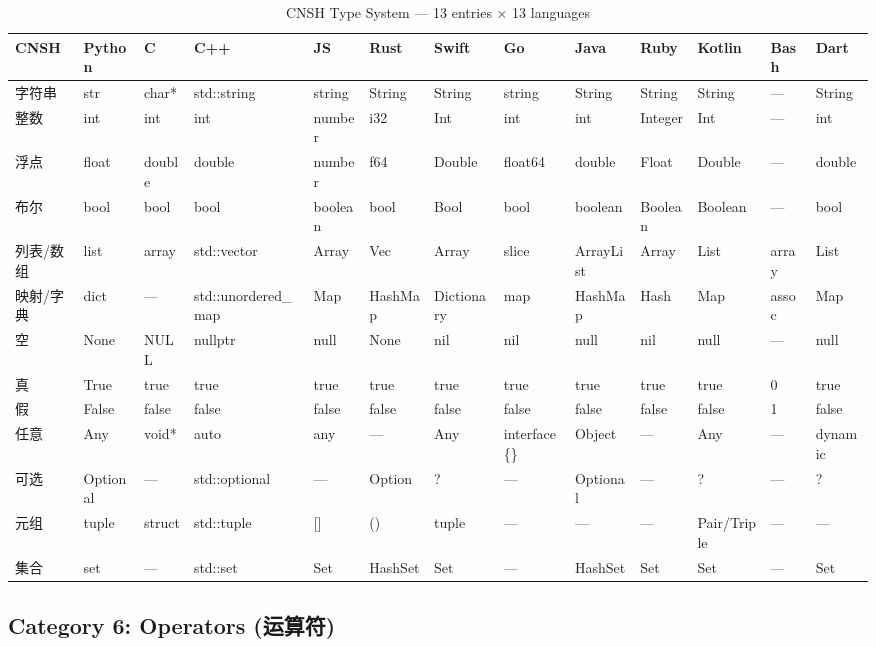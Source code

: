 \begin{table}[h]
\centering
\caption{CNSH Type System — 13 entries × 13 languages}
\renewcommand{\arraystretch}{1.2}
\fontsize{8}{10}\selectfont
\begin{tabular}{lllllllllllll}
\toprule
\textbf{CNSH} & \textbf{Python} & \textbf{C} & \textbf{C++} & \textbf{JS} & \textbf{Rust} & \textbf{Swift} & \textbf{Go} & \textbf{Java} & \textbf{Ruby} & \textbf{Kotlin} & \textbf{Bash} & \textbf{Dart} \\
\midrule
字符串 & str & char* & std::string & string & String & String & string & String & String & String & — & String \\
整数 & int & int & int & number & i32 & Int & int & int & Integer & Int & — & int \\
浮点 & float & double & double & number & f64 & Double & float64 & double & Float & Double & — & double \\
布尔 & bool & bool & bool & boolean & bool & Bool & bool & boolean & Boolean & Boolean & — & bool \\
列表/数组 & list & array & std::vector & Array & Vec & Array & slice & ArrayList & Array & List & array & List \\
映射/字典 & dict & — & std::unordered\_map & Map & HashMap & Dictionary & map & HashMap & Hash & Map & assoc & Map \\
空 & None & NULL & nullptr & null & None & nil & nil & null & nil & null & — & null \\
真 & True & true & true & true & true & true & true & true & true & true & 0 & true \\
假 & False & false & false & false & false & false & false & false & false & false & 1 & false \\
任意 & Any & void* & auto & any & — & Any & interface\{\} & Object & — & Any & — & dynamic \\
可选 & Optional & — & std::optional & — & Option & ? & — & Optional & — & ? & — & ? \\
元组 & tuple & struct & std::tuple & [] & () & tuple & — & — & — & Pair/Triple & — & — \\
集合 & set & — & std::set & Set & HashSet & Set & — & HashSet & Set & Set & — & Set \\
\bottomrule
\end{tabular}
\end{table}

\subsection{Category 6: Operators (运算符)}
\label{app:ren-operators}

